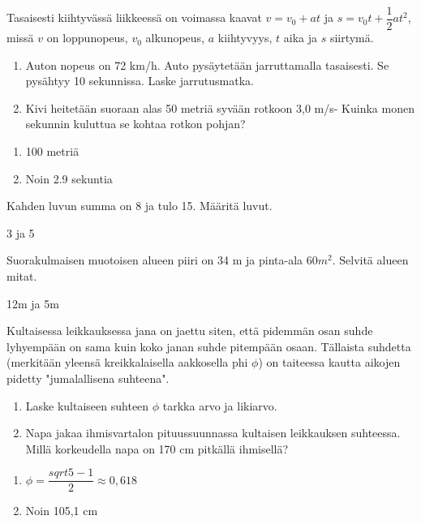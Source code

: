 \begin{tehtava}
    Tasaisesti kiihtyvässä liikkeessä on voimassa kaavat $v = v_0 + at$ ja $s = v_0t + \dfrac{1}{2}at^2$, missä $v$ on loppunopeus, $v_0$ alkunopeus, $a$ kiihtyvyys, $t$ aika ja $s$ siirtymä. 
		\begin{enumerate}
            \item Auton nopeus on 72 km/h. Auto pysäytetään jarruttamalla tasaisesti. Se pysähtyy 10 sekunnissa. Laske jarrutusmatka.
            \item Kivi heitetään suoraan alas 50 metriä syvään rotkoon 3,0 m/s- Kuinka monen sekunnin kuluttua se kohtaa rotkon pohjan?
        \end{enumerate}
    \begin{vastaus}
        \begin{enumerate}
            \item 100 metriä
            \item Noin 2.9 sekuntia
        \end{enumerate}
    \end{vastaus}
\end{tehtava}

\begin{tehtava}
    Kahden luvun summa on 8 ja tulo 15. Määritä luvut. 
    \begin{vastaus}
		3 ja 5
    \end{vastaus}
\end{tehtava}

\begin{tehtava}
    Suorakulmaisen muotoisen alueen piiri on 34 m ja pinta-ala 60$m^2$. Selvitä alueen mitat. 
    \begin{vastaus}
		12m ja 5m
    \end{vastaus}
\end{tehtava}

\begin{tehtava}
    Kultaisessa leikkauksessa jana on jaettu siten, että pidemmän osan suhde lyhyempään on sama kuin koko janan suhde pitempään osaan. Tällaista suhdetta (merkitään yleensä kreikkalaisella aakkosella phi $\phi$) on taiteessa kautta aikojen pidetty "jumalallisena suhteena".
		\begin{enumerate}
            \item Laske kultaiseen suhteen $\phi$ tarkka arvo ja likiarvo.
            \item Napa jakaa ihmisvartalon pituussuunnassa kultaisen leikkauksen suhteessa. Millä korkeudella napa on 170 cm pitkällä ihmisellä?
        \end{enumerate}
    \begin{vastaus}
        \begin{enumerate}
            \item $ \phi = \dfrac{sqrt{5}-1}{2} \approx 0,618$
            \item Noin 105,1 cm
        \end{enumerate}
    \end{vastaus}
\end{tehtava}
